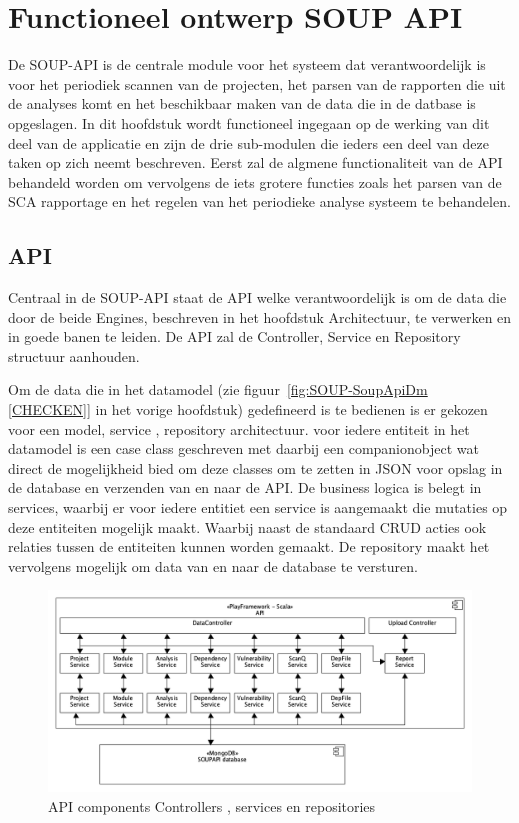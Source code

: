\chapter{Functioneel ontwerp SOUP API}\label{ch:impl soup api}
De SOUP-API is de centrale module voor het systeem dat verantwoordelijk is voor het periodiek scannen van de projecten, het parsen van de rapporten die uit de analyses komt en het beschikbaar maken van de data die in de datbase is opgeslagen. In dit hoofdstuk wordt functioneel ingegaan op de werking van dit deel van de applicatie en zijn de drie sub-modulen die ieders een deel van deze taken op zich neemt beschreven. Eerst zal de algmene functionaliteit van de API behandeld worden om vervolgens de iets grotere functies zoals het parsen van de SCA rapportage en het regelen van het periodieke analyse systeem te behandelen.


\section{API}\label{sec:api2}
Centraal in de SOUP-API staat de API welke verantwoordelijk is om de data die door de beide Engines, beschreven in het hoofdstuk Architectuur, te verwerken en in goede banen te leiden. De API zal de Controller, Service en Repository structuur aanhouden.

Om de data die in het datamodel (zie figuur~\ref{fig:SOUP-SoupApiDm [CHECKEN]} in het vorige hoofdstuk) gedefineerd is te bedienen is er gekozen voor een model, service , repository architectuur. voor iedere entiteit in het datamodel is een case class geschreven met daarbij een companionobject wat direct de mogelijkheid bied om deze classes om te zetten in JSON voor opslag in de database en verzenden van en naar de API. De business logica is belegt in services, waarbij er voor iedere entitiet een service is aangemaakt die mutaties op deze entiteiten mogelijk maakt. Waarbij naast de standaard CRUD acties ook relaties tussen de entiteiten kunnen worden gemaakt. De repository maakt het vervolgens mogelijk om data van en naar de database te versturen.

\begin{figure}[bth]
    \myfloatalign
    \includegraphics[width=12cm]{gfx/umlet/exports/API-ComponentsDiagram}
    \caption{API components Controllers , services en repositories}
    \label{fig:API components}
\end{figure}


